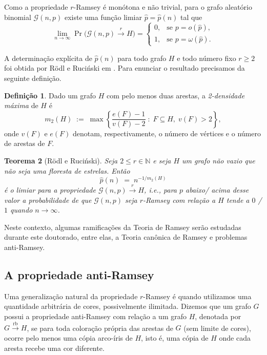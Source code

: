 \documentclass[reqno, 12pt]{amsart}
\numberwithin{equation}{section}
\theoremstyle{definition}
\newtheorem{definition}{Definição}[section]
\theoremstyle{plain}
\newtheorem{theorem}[definition]{Teorema}
\begin{document}
Como a propriedade \(r\)-Ramsey é monótona e não trivial, para o grafo aleatório binomial \(\mathcal{G}(n,p)\) existe uma função limiar \(\widehat p=\widehat p(n)\) tal que
\[
\lim_{n\to\infty}\Pr\big(\mathcal{G}(n,p) \xrightarrow{r} H\big)
=
\begin{cases}
0, & \text{se } p = o(\widehat p),\\[4pt]
1, & \text{se } p = \omega(\widehat p).
\end{cases}
\]

A determinação explícita de \(\widehat p(n)\) para todo grafo \(H\) e todo número fixo \(r\ge 2\) foi obtida por Rödl e Ruciński em \cite{rodlruc1995threshold}. Para enunciar o resultado precisamos da seguinte definição.

\begin{definition}
\label{def:m2}
Dado um grafo \(H\) com pelo menos duas arestas, a \emph{2-densidade máxima} de \(H\) é
\[
m_2(H) \;:=\; \max\left\{ \frac{e(F)-1}{v(F)-2} \;:\; F\subseteq H,\; v(F)>2 \right\},
\]
onde \(v(F)\) e \(e(F)\) denotam, respectivamente, o número de vértices e o número de arestas de \(F\).
\end{definition}

\begin{theorem}[R\"odl e Ruci\'nski]
\label{thm:rod-ruc}
Seja \(2\le r\in\mathbb{N}\) e seja \(H\) um grafo não vazio que não seja uma floresta de estrelas. Então
\[
\widehat p(n) \;=\; n^{-1/m_2(H)}
\]
é o limiar para a propriedade \(\mathcal{G}(n,p)\xrightarrow{r} H\), i.e., para \(p\) abaixo/ acima desse valor a probabilidade de que \(\mathcal{G}(n,p)\) seja \(r\)-Ramsey com relação a \(H\) tende a \(0\) / \(1\) quando \(n\to\infty\).
\end{theorem}


Neste contexto, algumas ramificações da Teoria de Ramsey serão estudadas durante este doutorado, entre elas, a Teoria canônica de Ramsey e problemas anti-Ramsey.

\subsection{A propriedade anti-Ramsey}
Uma generalização natural da propriedade $r$-Ramsey é quando utilizamos uma quantidade arbitrária de cores, possivelmente ilimitada. Dizemos que um grafo $G$ possui a propriedade anti-Ramsey com relação a um grafo $H$, denotada por $G \xrightarrow{\text{rb}} H$, se para toda coloração própria das arestas de $G$ (sem limite de cores), ocorre pelo menos uma cópia arco-íris de $H$, isto é, uma cópia de $H$ onde cada aresta recebe uma cor diferente.
\end{document}

